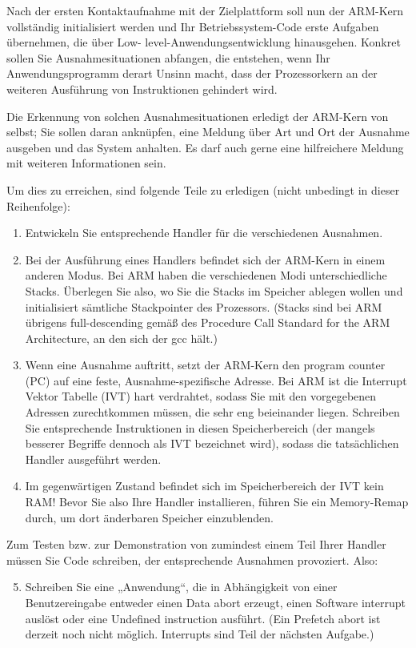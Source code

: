 \begin{description}
Nach der ersten Kontaktaufnahme mit der Zielplattform soll nun der ARM-Kern vollständig
initialisiert werden und Ihr Betriebssystem-Code erste Aufgaben übernehmen, die über Low-
level-Anwendungsentwicklung hinausgehen. Konkret sollen Sie Ausnahmesituationen
abfangen, die entstehen, wenn Ihr Anwendungsprogramm derart Unsinn macht, dass der
Prozessorkern an der weiteren Ausführung von Instruktionen gehindert wird.

Die Erkennung von solchen Ausnahmesituationen erledigt der ARM-Kern von selbst; Sie sollen
daran anknüpfen, eine Meldung über Art und Ort der Ausnahme ausgeben und das System
anhalten. Es darf auch gerne eine hilfreichere Meldung mit weiteren Informationen sein.

Um dies zu erreichen, sind folgende Teile zu erledigen (nicht unbedingt in dieser Reihenfolge):
\begin{enumerate}
	\item Entwickeln Sie entsprechende Handler für die verschiedenen Ausnahmen.
	\item Bei der Ausführung eines Handlers befindet sich der ARM-Kern in einem anderen Modus. Bei ARM haben die verschiedenen Modi unterschiedliche Stacks. Überlegen Sie also, wo Sie die Stacks im Speicher ablegen wollen und initialisiert sämtliche Stackpointer des Prozessors. (Stacks sind bei ARM übrigens full-descending gemäß des Procedure Call Standard for the ARM Architecture, an den sich der gcc hält.)
	\item Wenn eine Ausnahme auftritt, setzt der ARM-Kern den program counter (PC) auf eine feste, Ausnahme-spezifische Adresse. Bei ARM ist die Interrupt Vektor Tabelle (IVT) hart verdrahtet, sodass Sie mit den vorgegebenen Adressen zurechtkommen müssen, die sehr eng beieinander liegen. Schreiben Sie entsprechende Instruktionen in diesen Speicherbereich (der mangels besserer Begriffe dennoch als IVT bezeichnet wird), sodass die tatsächlichen Handler ausgeführt werden.
	\item Im gegenwärtigen Zustand befindet sich im Speicherbereich der IVT kein RAM! Bevor Sie also Ihre Handler installieren, führen Sie ein Memory-Remap durch, um dort änderbaren Speicher einzublenden.\end{enumerate}
Zum Testen bzw. zur Demonstration von zumindest einem Teil Ihrer Handler müssen Sie Code schreiben, der entsprechende Ausnahmen provoziert. Also:
\begin{enumerate}
	\setcounter{enumi}{4}
	\item Schreiben Sie eine „Anwendung“, die in Abhängigkeit von einer Benutzereingabe entweder einen Data abort erzeugt, einen Software interrupt auslöst oder eine Undefined instruction ausführt. (Ein Prefetch abort ist derzeit noch nicht möglich. Interrupts sind Teil der nächsten Aufgabe.)
\end{enumerate}


\end{description}
